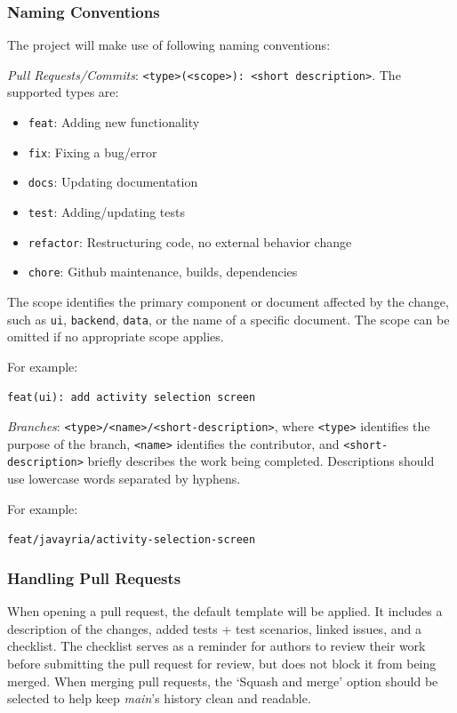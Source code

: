 \documentclass{article}
\begin{document}
\subsubsection*{Naming Conventions}
The project will make use of following naming conventions:

\textit{Pull Requests/Commits}: \texttt{<type>(<scope>): <short description>}. The supported types are:
\begin{itemize}
    \item \texttt{feat}: Adding new functionality
    \item \texttt {fix}: Fixing a bug/error
    \item \texttt{docs}: Updating documentation
    \item \texttt{test}: Adding/updating tests
    \item \texttt{refactor}: Restructuring code, no external behavior change
    \item \texttt{chore}: Github maintenance, builds, dependencies
\end{itemize} The scope identifies the primary component or document affected by the change, such as \texttt{ui}, \texttt{backend}, \texttt{data}, or the name of a specific document. The scope can be omitted if no appropriate scope applies.

For example:
\begin{center}
\texttt{feat(ui): add activity selection screen}
\end{center}

\textit{Branches}: \texttt{<type>/<name>/<short-description>}, where \texttt{<type>} identifies the purpose of the branch, \texttt{<name>} identifies the contributor, and \texttt{<short-description>} briefly describes the work being completed. Descriptions should use lowercase words separated by hyphens.

For example:
\begin{center}
\texttt{feat/javayria/activity-selection-screen}
\end{center}

\subsubsection*{Handling Pull Requests}

When opening a pull request, the default template will be applied. It includes a description of the changes, added tests + test scenarios, linked issues, and a checklist. The checklist serves as a reminder 
for authors to review their work before submitting the pull request for review, but does not block it from being merged.
When merging pull requests, the `Squash and merge' option should be selected to help keep \textit{main}'s history clean and readable.
\end{document}
